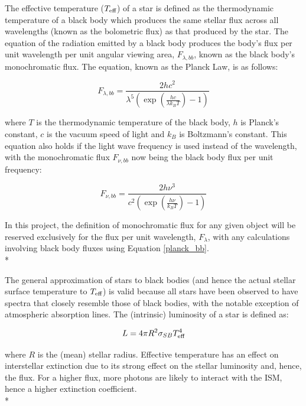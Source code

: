 \documentclass[12pt, a4paper]{report}
\begin{document}
The effective temperature ($T_{\textnormal{eff}}$) of a star is defined as the thermodynamic temperature of a black body which produces the same stellar flux across all wavelengths (known as the bolometric flux) as that produced by the star. The equation of the radiation emitted by a black body produces the body's flux per unit wavelength per unit angular viewing area, $F_{\lambda,bb}$, known as the black body's monochromatic flux. The equation, known as the Planck Law, is as follows:


\begin{equation}
F_{\lambda,bb} = \frac{2hc^{2}}{\lambda^{5}\left(\exp\left({\frac{hc}{\lambda k_{B}T}}\right) - 1\right)}
\label{planck_bb}
\end{equation} 

where $T$ is the thermodynamic temperature of the black body, $h$ is Planck's constant, $c$ is the vacuum speed of light and $k_{B}$ is Boltzmann's constant. This equation also holds if the light wave frequency is used instead of the wavelength, with the monochromatic flux $F_{\nu,bb}$ now being the black body flux per unit frequency:

\begin{equation}
F_{\nu,bb} = \frac{2h\nu^{3}}{c^{2}\left(\exp\left({\frac{h\nu}{k_{B}T}}\right) - 1\right)}
\label{planck_bb_freq}
\end{equation}

In this project, the definition of monochromatic flux for any given object will be reserved exclusively for the flux per unit wavelength, $F_{\lambda}$, with any calculations involving black body fluxes using Equation \ref{planck_bb}. \\*

The general approximation of stars to black bodies (and hence the actual stellar surface temperature to $T_{\textnormal{eff}}$) is valid because all stars have been observed to have spectra that closely resemble those of black bodies, with the notable exception of atmospheric absorption lines. The (intrinsic) luminosity of a star is defined as:

\begin{equation}
L = 4 \pi R^{2} \sigma_{SB} T_{\textnormal{eff}}^{4}
\label{Teff_def}
\end{equation}

where $R$ is the (mean) stellar radius. Effective temperature has an effect on interstellar extinction due to its strong effect on the stellar luminosity and, hence, the flux. For a higher flux, more photons are likely to interact with the ISM, hence a higher extinction coefficient. \\*
\end{document}
